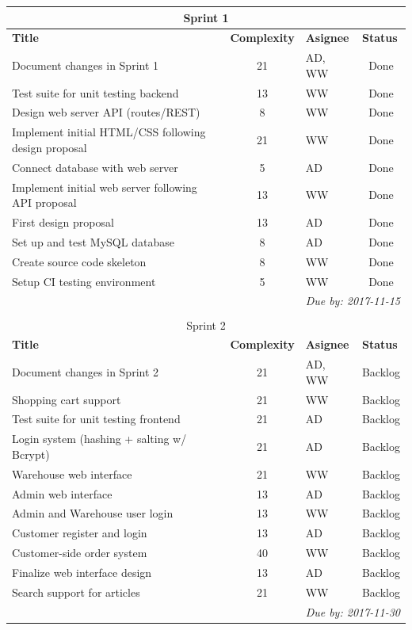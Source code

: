 \documentclass{article}
\newcounter{magicrownumbers}
\newcommand\rownumber{\stepcounter{magicrownumbers}\arabic{magicrownumbers}}
\begin{document}
\begin{table}[H]
\centering
\begin{tabular}{| @{\makebox[3em][c]{\rownumber.\space}} l|c|l|c|}
\multicolumn{4}{c}{\large{Sprint 1}} \\
\hline
\multicolumn{1}{|l}{\textbf{Title}} & \multicolumn{1}{l}{\textbf{Complexity}} & \multicolumn{1}{l|}{\textbf{Asignee}} & \multicolumn{1}{l|}{\textbf{Status}} \\ \hline 
Document changes in Sprint 1 & 21 & AD, WW & Done \\
Test suite for unit testing backend & 13 & WW & Done \\
Design web server API (routes/REST) & 8 & WW & Done \\
Implement initial HTML/CSS following design proposal & 21 & WW & Done \\
Connect database with web server & 5 & AD & Done \\
Implement initial web server following API proposal & 13 & WW & Done \\
First design proposal & 13 & AD & Done \\
Set up and test MySQL database & 8 & AD & Done \\
Create source code skeleton & 8 & WW & Done \\
Setup CI testing environment & 5 & WW & Done \\
\hline
\multicolumn{4}{r}{\textit{Due by: 2017-11-15}} \\

\multicolumn{4}{l}{} \\
\multicolumn{4}{c}{\large{Sprint 2}} \\
\hline
\multicolumn{1}{|l}{\textbf{Title}} & \multicolumn{1}{l}{\textbf{Complexity}} & \multicolumn{1}{l|}{\textbf{Asignee}} & \multicolumn{1}{l|}{\textbf{Status}} \\ \hline
Document changes in Sprint 2 & 21 & AD, WW & Backlog \\
Shopping cart support & 21 & WW & Backlog \\
Test suite for unit testing frontend & 21 & AD & Backlog \\
Login system (hashing + salting w/ Bcrypt) & 21 & AD & Backlog \\
Warehouse web interface & 21 & WW & Backlog \\
Admin web interface & 13 & AD & Backlog \\
Admin and Warehouse user login & 13 & WW & Backlog \\
Customer register and login & 13 & AD & Backlog \\
Customer-side order system & 40 & WW & Backlog \\
Finalize web interface design & 13 & AD & Backlog \\
Search support for articles & 21 & WW & Backlog \\
\hline
\multicolumn{4}{r}{\textit{Due by: 2017-11-30}} \\


\end{tabular}
\end{table}
\end{document}
